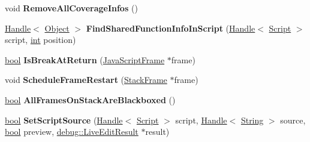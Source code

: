 \begin{DoxyCompactItemize}
\item 
\mbox{\label{classv8_1_1internal_1_1Debug_a491eb0681a2e838e20f167c2afffd1f0}} 
void {\bfseries Remove\+All\+Coverage\+Infos} ()
\item 
\mbox{\label{classv8_1_1internal_1_1Debug_ab79ead073168530c9004cc0f31ec7fb9}} 
\mbox{\hyperlink{classv8_1_1internal_1_1Handle}{Handle}}$<$ \mbox{\hyperlink{classv8_1_1internal_1_1Object}{Object}} $>$ {\bfseries Find\+Shared\+Function\+Info\+In\+Script} (\mbox{\hyperlink{classv8_1_1internal_1_1Handle}{Handle}}$<$ \mbox{\hyperlink{classv8_1_1internal_1_1Script}{Script}} $>$ script, \mbox{\hyperlink{classint}{int}} position)
\item 
\mbox{\label{classv8_1_1internal_1_1Debug_af5fc31cb9511b4fcf59263b3c30ab670}} 
\mbox{\hyperlink{classbool}{bool}} {\bfseries Is\+Break\+At\+Return} (\mbox{\hyperlink{classv8_1_1internal_1_1JavaScriptFrame}{Java\+Script\+Frame}} $\ast$frame)
\item 
\mbox{\label{classv8_1_1internal_1_1Debug_a362f833f4afe8a1b21eb3776604623f7}} 
void {\bfseries Schedule\+Frame\+Restart} (\mbox{\hyperlink{classv8_1_1internal_1_1StackFrame}{Stack\+Frame}} $\ast$frame)
\item 
\mbox{\label{classv8_1_1internal_1_1Debug_aa1edba0304da3942f4c5f489b7bbc838}} 
\mbox{\hyperlink{classbool}{bool}} {\bfseries All\+Frames\+On\+Stack\+Are\+Blackboxed} ()
\item 
\mbox{\label{classv8_1_1internal_1_1Debug_afd69d9b0ad238913ed14573d5ecd535d}} 
\mbox{\hyperlink{classbool}{bool}} {\bfseries Set\+Script\+Source} (\mbox{\hyperlink{classv8_1_1internal_1_1Handle}{Handle}}$<$ \mbox{\hyperlink{classv8_1_1internal_1_1Script}{Script}} $>$ script, \mbox{\hyperlink{classv8_1_1internal_1_1Handle}{Handle}}$<$ \mbox{\hyperlink{classv8_1_1internal_1_1String}{String}} $>$ source, \mbox{\hyperlink{classbool}{bool}} preview, \mbox{\hyperlink{structv8_1_1debug_1_1LiveEditResult}{debug\+::\+Live\+Edit\+Result}} $\ast$result)
\item 
\mbox{\label{classv8_1_1internal_1_1Debug_a95a9087364660155a180af983348a2d5}} 

\end{DoxyCompactItemize}
